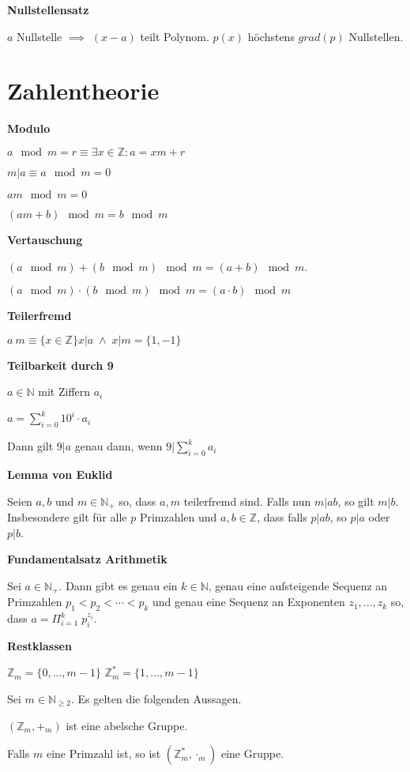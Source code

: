 \documentclass[a4paper,10pt]{article}
\newcommand{\N}{\mathbb{N}}
\newcommand{\natnum}{\mathbb{N}}
\newcommand{\Z}{\mathbb{Z}}
\newcommand{\integers}{\mathbb{Z}}
\newcommand{\modulo}{\mod}
\newcommand{\lt}{<}
\begin{document}
\begin{multicols}{3}
\textbf{Nullstellensatz}

$a$ Nullstelle $\implies$ $(x-a)$ teilt Polynom. $p(x)$ höchstens $grad(p)$ Nullstellen.

\section{Zahlentheorie}

\textbf{Modulo}

$a \mod m = r \equiv \exists x \in \Z: a = xm +r$

$m|a \equiv a \mod m = 0$

$am \modulo m = 0$

$(am+b) \modulo m = b \modulo m$

\textbf{Vertauschung}

$(a \modulo m) + (b \modulo m) \modulo m = (a+b) \modulo m$.

$(a \modulo m) \cdot (b \modulo m) \modulo m = (a \cdot b) \modulo m$

\textbf{Teilerfremd}

$a \ m \equiv \{x \in \integers\}{x |a \; \wedge \; x | m} = \{1,-1\}$

\textbf{Teilbarkeit durch 9}

$a \in \N$ mit Ziffern $a_i$

$a = \sum_{i=0}^k 10^i \cdot a_i$

Dann gilt $9 | a$ genau dann, wenn $9 | \sum_{i=0}^k a_i$

\textbf{Lemma von Euklid}

Seien $a,b$ und $m \in \natnum_+$ so, dass $a,m$ teilerfremd sind. Falls nun $m | ab$, so gilt $m|b$.
Insbesondere gilt für alle $p$ Primzahlen und $a,b \in \integers$, dass falls $p | ab$, so $p | a$ oder $p | b$. 

\textbf{Fundamentalsatz Arithmetik}

Sei $a \in \natnum_+$. Dann gibt es genau ein 
$k \in \natnum$, genau eine aufsteigende Sequenz an Primzahlen 
$p_1 \lt p_2 \lt \cdots \lt p_k$ und genau eine Sequenz an Exponenten $z_1,...,z_k$ so, dass $a = \Pi_{i=1}^k \; p_i^{z_i}.$ 

\textbf{Restklassen}

$\integers_m = \{0,...,m-1\}$ $\integers_m^* = \{1,...,m-1\}$

Sei $m \in \natnum_{\geq 2}$. Es gelten die folgenden Aussagen.

$(\integers_m,+_m)$ ist eine abelsche Gruppe.

Falls $m$ eine Primzahl ist, so ist $(\integers_m^*,\cdot_m)$ eine Gruppe.


\end{multicols}
\end{document}
